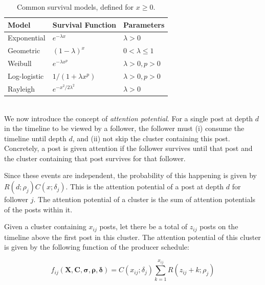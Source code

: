 \documentclass[onesided,letterpaper]{tufte-book}
\begin{document}
\begin{table}
  \centering
  \selectfont
  \begin{tabular}{lll}
    \toprule
    \textbf{Model} & \textbf{Survival Function} & \textbf{Parameters} \\
    \midrule
    Exponential   & $e^{-\lambda x}$             & $\lambda>0$\\
    Geometric     & $(1 - \lambda)^{x}$          & $0<\lambda \leq 1$\\
    Weibull       & $e^{-\lambda x^p}$           & $\lambda>0, p>0$\\
    Log-logistic  & $1 / (1 + \lambda x^p)$      & $\lambda>0, p>0$\\
    Rayleigh      & $e^{-x^2/2\lambda^2}$        & $\lambda>0$\\
    \bottomrule
  \end{tabular}
  \caption[Common survival models.]{Common survival models, defined for $x \geq 0$.}
  \label{table:survival-functions}
\end{table}

\\[2.5pc]

We now introduce the concept of \textit{attention potential}. For a single post at depth $d$ in the timeline to be viewed by a follower, the follower must (i) consume the timeline until depth $d$, and (ii) not skip the cluster containing this post. Concretely, a post is given attention if the follower survives until that post and the cluster containing that post survives for that follower.

Since these events are independent, the probability of this happening is given by $R(d;\rho_j)C(x;\delta_j)$. This is the attention potential of a post at depth $d$ for follower $j$. The attention potential of a cluster is the sum of attention potentials of the posts within it.

Given a cluster containing $x_{ij}$ posts, let there be a total of $z_{ij}$ posts on the timeline above the first post in this cluster. The attention potential of this cluster is given by the following function of the producer schedule:

\begin{equation}
  f_{ij}(\mathbf{X}, \mathbf{C}, \boldsymbol\sigma, \boldsymbol\rho, \boldsymbol\delta) = C(x_{ij};\delta_j)\sum_{k=1}^{x_{ij}}R(z_{ij} + k;\rho_j)
  \label{eq:slot-value}
\end{equation}
\end{document}
